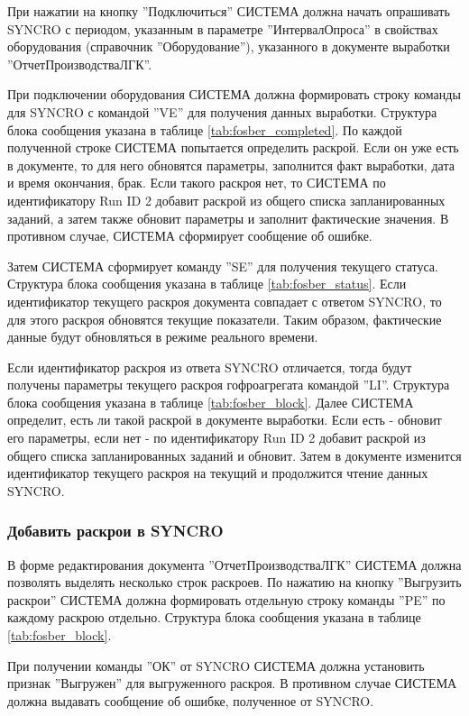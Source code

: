 При нажатии на кнопку ''Подключиться'' СИСТЕМА должна начать опрашивать SYNCRO с периодом, указанным в параметре ''ИнтервалОпроса'' в свойствах оборудования (справочник ''Оборудование''), указанного в документе выработки ''ОтчетПроизводстваЛГК''.

При подключении оборудования СИСТЕМА должна формировать строку команды для SYNCRO с командой ''VE'' для получения данных выработки.
Структура блока сообщения указана в таблице \ref{tab:fosber_completed}.
По каждой полученной строке СИСТЕМА попытается определить раскрой. Если он уже есть в документе, то для него обновятся параметры, заполнится факт выработки, дата и время окончания, брак. Если такого раскроя нет, то СИСТЕМА по идентификатору Run ID 2 добавит раскрой из общего списка запланированных заданий, а затем также обновит параметры и заполнит фактические значения. В противном случае, СИСТЕМА сформирует сообщение об ошибке. 

Затем СИСТЕМА сформирует команду ''SE'' для получения текущего статуса.
Структура блока сообщения указана в таблице \ref{tab:fosber_status}.
Если идентификатор текущего раскроя документа совпадает с ответом SYNCRO, то для этого раскроя обновятся текущие показатели. Таким образом, фактические данные будут обновляться в режиме реального времени. 

Если идентификатор раскроя из ответа SYNCRO отличается, тогда будут получены параметры текущего раскроя гофроагрегата командой ''LI''.
Структура блока сообщения указана в таблице \ref{tab:fosber_block}.
Далее СИСТЕМА определит, есть ли такой раскрой в документе выработки. Если есть - обновит его параметры, если нет - по идентификатору Run ID 2 добавит раскрой из общего списка запланированных заданий и обновит. Затем в документе изменится идентификатор текущего раскроя на текущий и продолжится чтение данных SYNCRO.

\subsubsection{Добавить раскрои в SYNCRO}

В форме редактирования документа ''ОтчетПроизводстваЛГК'' СИСТЕМА должна позволять выделять  несколько строк раскроев. 
По нажатию на кнопку ''Выгрузить раскрои'' СИСТЕМА должна формировать отдельную строку команды ''PE'' по каждому раскрою отдельно.
Структура блока сообщения указана в таблице \ref{tab:fosber_block}.

При получении команды ''ОК'' от SYNCRO СИСТЕМА должна установить признак ''Выгружен'' для выгруженного раскроя.
В противном случае СИСТЕМА должна выдавать сообщение об ошибке, полученное от SYNCRO.


